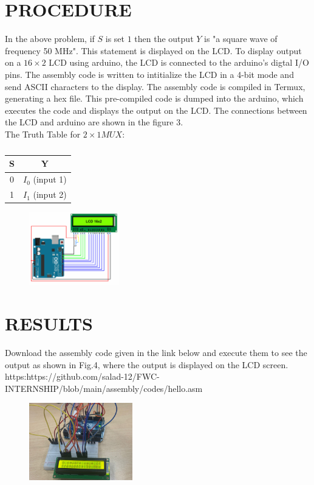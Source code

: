 \documentclass[conference]{IEEEtran}
\begin{document}
\section{PROCEDURE}
In the above problem, if $S$ is set $1$ then the output $Y$ is "a square wave of frequency 50 MHz". This statement is displayed on the LCD. To display output on a $16\times2$ LCD using arduino, the LCD is connected to the arduino's digtal I/O pins. The assembly code is written to intitialize the LCD in a 4-bit mode and send ASCII characters to the display. The assembly code is compiled in Termux, generating a hex file. This pre-compiled code is dumped into the arduino, which executes the code and displays the output on the LCD. The connections between the LCD and arduino are shown in the figure 3. \\ The Truth Table for $2\times1 MUX$:
 \begin{table}[htbp]
	 \centering
	 \begin{tabular}{| c | c |}\hline
		 S  & Y\\
		 \hline
		  0 & $I_{0}$ (input 1)\\ \hline
		  1 & $I_{1}$ (input 2)\\ 
		  \hline
	 \end{tabular}
	 \vspace{0.1cm}
	 \caption{\label{tab:widgets}}
 \end{table}
 \begin{figure}[h]
	 \centering
	 \includegraphics[width=0.35\textwidth]{connec.png}
	 \caption{\label{fig:Connections}}
 \end{figure}
\section{RESULTS}
Download the assembly code given in the link below and execute them to see the output as shown in Fig.4, where the output is displayed on the LCD screen.\\
 https:https://github.com/salad-12/FWC-INTERNSHIP/blob/main/assembly/codes/hello.asm
\begin{figure}[h] 
	\centering 
	\includegraphics[width=0.4\textwidth]{assembly.jpg}
	\caption{\label{fig:Result}}    
\end{figure}
\end{document}

